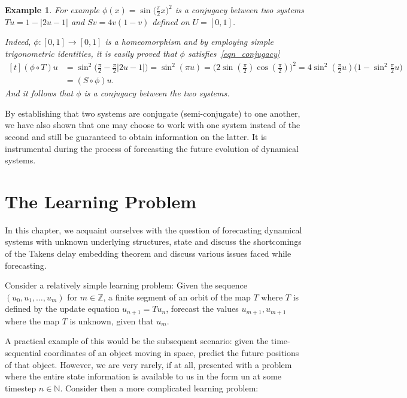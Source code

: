 \documentclass[a4paper,12pt,twoside]{report}
\newtheorem{Example}{Example}[]
\begin{document}
\begin{Example}\rm
  For example $\phi(x)=\sin\big(\frac{\pi}{2}x\big)^2$ is a conjugacy between two systems $Tu=1-|2u-1|$ and $Sv=4v(1-v)$  defined on $U=[0,1]$.  

  Indeed, $\phi:[0,1]\to[0,1]$ is a homeomorphism and by employing simple trigonometric identities, it is easily proved that $\phi$ satisfies~\ref{eqn_conjugacy}
  \[
    \begin{aligned}[t]
      (\phi\circ{T})u 
                &=\sin^{2}\Big(\frac{\pi}{2} - \frac{\pi}{2}|2u-1|\Big) = \sin^{2}(\pi{u})=\Big(2\sin(\frac{\pi}{2})\cos(\frac{\pi}{2})\Big)^{2}=4\sin^{2}(\frac{\pi}{2}u)\Big(1-\sin^{2}\frac{\pi}{2}u\Big) \\
                                    &=({S}\circ\phi)u.
    \end{aligned}
\]
And it follows that $\phi$ is a conjugacy between the two systems.
\end{Example}


By establishing that two systems are conjugate (semi-conjugate) to one another, we have also shown that one may choose to work with one system instead of the second and still be guaranteed to obtain information on the latter. It is instrumental during the process of forecasting the future evolution of dynamical systems.


\chapter{The Learning Problem}\label{ch3}

In this chapter, we acquaint ourselves with the question of forecasting dynamical systems with unknown underlying structures, state and discuss the shortcomings of the Takens delay embedding theorem and discuss various issues faced while forecasting.

Consider a relatively simple learning problem: 
Given the sequence $(u_0, u_1, \ldots, u_m)$ for $m\in\mathbb{Z}$, a finite segment of an orbit of the map $T$ where $T$ is defined by the update equation $u_{n+1} = Tu_n$, forecast the values $u_{m+1}, u_{m+1}$ where the map $T$ is unknown, given that $u_m$. 

A practical example of this would be the subsequent scenario: given the time-sequential coordinates of an object moving in space, predict the future positions of that object. However, we are very rarely, if at all, presented with a problem where the entire state information is available to us in the form un at some timestep $n\in\mathbb{N}$. Consider then a more complicated learning problem:
\end{document}
